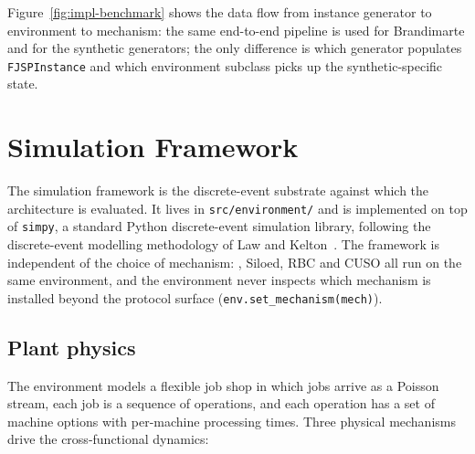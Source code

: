 Figure~\ref{fig:impl-benchmark} shows the data flow from instance
generator to environment to mechanism: the same end-to-end pipeline is
used for Brandimarte and for the synthetic generators; the only
difference is which generator populates \texttt{FJSPInstance} and which
environment subclass picks up the synthetic-specific state.


\section{Simulation Framework}
\label{sec:impl-simframework}

The simulation framework is the discrete-event substrate against which
the architecture is evaluated. It lives in \texttt{src/environment/}
and is implemented on top of \texttt{simpy}, a standard Python
discrete-event simulation library, following the discrete-event
modelling methodology of Law and Kelton~\cite{law2000simulation}. The
framework is independent of the
choice of mechanism: \NEXUS{}, Siloed, RBC and CUSO all run on the same
environment, and the environment never inspects which mechanism is
installed beyond the protocol surface
(\texttt{env.set\_mechanism(mech)}).

\subsection{Plant physics}

The environment models a flexible job shop in which jobs arrive as a
Poisson stream, each job is a sequence of operations, and each
operation has a set of machine options with per-machine processing
times. Three physical mechanisms drive the cross-functional dynamics:

